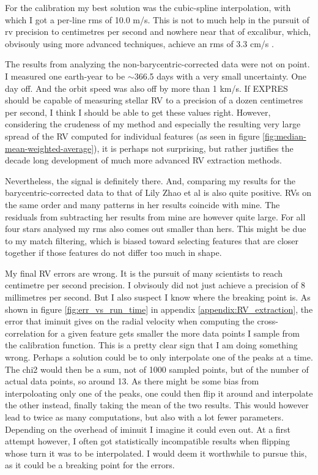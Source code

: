 
For the calibration my best solution was the cubic-spline interpolation, with which I got a per-line rms of 10.0 m/s. This is not to much help in the pursuit of rv precision to centimetres per second and nowhere near that of excalibur, which, obvisouly using more advanced techniques, achieve an rms of 3.3 cm/s \cite{zhao2021excalibur}. 

The results from analyzing the non-barycentric-corrected data were not on point. I measured one earth-year to be $\sim$366.5 days with a very small uncertainty. One day off. And the orbit speed was also off by more than 1 km/s. If EXPRES should be capable of measuring stellar RV to a precision of a dozen centimetres per second, I think I should be able to get these values right. However, considering the crudeness of my method and especially the resulting very large spread of the RV computed for individual features (as seen in figure \ref{fig:median-mean-weighted-average}), it is perhaps not surprising, but rather justifies the decade long development of much more advanced RV extraction methods.

Nevertheless, the signal is definitely there. And, comparing my results for the barycentric-corrected data to that of Lily Zhao et al is also quite positive. RVs on the same order and many patterns in her results coincide with mine. The residuals from subtracting her results from mine are however quite large. For all four stars analysed my rms also comes out smaller than hers. This might be due to my match filtering, which is biased toward selecting features that are closer together if those features do not differ too much in shape.

My final RV errors are wrong. It is the pursuit of many scientists to reach centimetre per second precision. I obvisouly did not just achieve a precision of 8 millimetres per second. But I also suspect I know where the breaking point is.
As shown in figure \ref{fig:err_vs_run_time} in appendix \ref{appendix:RV_extraction}, the error that iminuit gives on the radial velocity when computing the cross-correlation for a given feature gets smaller the more data points I sample from the calibration function. This is a pretty clear sign that I am doing something wrong. Perhaps a solution could be to only interpolate one of the peaks at a time. The chi2 would then be a sum, not of 1000 sampled points, but of the number of actual data points, so around 13. As there might be some bias from interpoloating only one of the peaks, one could then flip it around and interpolate the other instead, finally taking the mean of the two results. This would however lead to twice as many computations, but also with a lot fewer parameters. Depending on the overhead of iminuit I imagine it could even out. At a first attempt however, I often got statistically incompatible results when flipping whose turn it was to be interpolated. I would deem it worthwhile to pursue this, as it could be a breaking point for the errors. 

